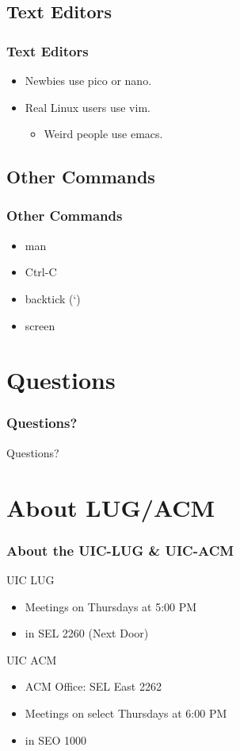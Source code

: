 \documentclass[hyperref={pdfpagelabels=false}]{beamer}
\begin{document}
\subsection{Text Editors}
\frame
{
    \frametitle{Text Editors}
    \begin{itemize}
    \item{Newbies use pico or nano.}
    \item{Real Linux users use vim.}
        \begin{itemize}
        \item{Weird people use emacs.}
        \end{itemize}
    \end{itemize}
}
\subsection{Other Commands}
\frame
{
    \frametitle{Other Commands}
    \begin{itemize}
    \item{man}
    \item{Ctrl-C}
    \item{backtick (`)}
    \item{screen}
    \end{itemize}
}
\section{Questions}
\frame
{
    \frametitle{Questions?}
    Questions?
}
\section{About LUG/ACM}
\frame
{
    \frametitle{About the UIC-LUG \& UIC-ACM}
    UIC LUG
    \begin{itemize}
    \item{Meetings on Thursdays at 5:00 PM}
    \item{in SEL 2260 (Next Door)}
    \end{itemize}
    UIC ACM
    \begin{itemize}
    \item{ACM Office: SEL East 2262}
    \item{Meetings on select Thursdays at 6:00 PM}
    \item{in SEO 1000}
    \end{itemize}
}
\end{document}
